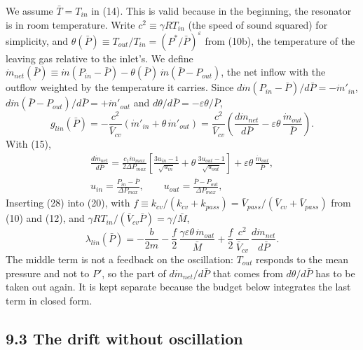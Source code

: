 \documentclass[11pt]{article}
\begin{document}
We assume $\bar T = T_{in}$ in (14). This is valid because in the beginning, the resonator is in room temperature. Write $c^2 \equiv \gamma RT_{in}$ (the speed of sound squared) for simplicity, and $\theta(\bar P) \equiv T_{out}/T_{in} = (P^*/\bar P)^{\varepsilon}$ from (10b), the temperature of the leaving gas relative to the inlet's. We define $\dot m_{net}(\bar P) \equiv \dot m(P_{in} - \bar P) - \theta(\bar P)\,\dot m(\bar P - P_{out})$, the net inflow with the outflow weighted by the temperature it carries. Since $d\dot m(P_{in} - \bar P)/d\bar P = -\dot m'_{in}$, $d\dot m(\bar P - P_{out})/d\bar P = +\dot m'_{out}$ and $d\theta/d\bar P = -\varepsilon\theta/\bar P$,
\begin{equation}
g_{lin}(\bar P) = -\frac{c^2}{\bar V_{cv}}\left(\dot m'_{in} + \theta\,\dot m'_{out}\right) = \frac{c^2}{\bar V_{cv}}\left(\frac{d\dot m_{net}}{d\bar P} - \varepsilon\theta\,\frac{\dot m_{out}}{\bar P}\right) . \tag{28}
\end{equation}
With (15),
\begin{equation}
\begin{gathered}
\frac{d\dot m_{net}}{d\bar P} = \frac{c_1\dot m_{max}}{2\Delta P_{max}}\left[\frac{3u_{in}-1}{\sqrt{u_{in}}} + \theta\,\frac{3u_{out}-1}{\sqrt{u_{out}}}\right] + \varepsilon\theta\,\frac{\dot m_{out}}{\bar P}, \\
u_{in} = \frac{P_{in} - \bar P}{\Delta P_{max}}, \qquad u_{out} = \frac{\bar P - P_{out}}{\Delta P_{max}},
\end{gathered} \tag{29}
\end{equation}
Inserting (28) into (20), with $f \equiv k_{cv}/(k_{cv} + k_{pass}) = \bar V_{pass}/(\bar V_{cv} + \bar V_{pass})$ from (10) and (12), and $\gamma RT_{in}/(\bar V_{cv}\bar P) = \gamma/\bar M$,
\begin{equation}
\lambda_{lin}(\bar P) = -\frac{b}{2m} - \frac{f}{2}\,\frac{\gamma\varepsilon\theta\,\dot m_{out}}{\bar M} + \frac{f}{2}\,\frac{c^2}{\bar V_{cv}}\,\frac{d\dot m_{net}}{d\bar P} . \tag{30}
\end{equation}
The middle term is not a feedback on the oscillation: $T_{out}$ responds to the mean pressure and not to $P'$, so the part of $d\dot m_{net}/d\bar P$ that comes from $d\theta/d\bar P$ has to be taken out again. It is kept separate because the budget below integrates the last term in closed form.

\subsection*{9.3 The drift without oscillation}
\end{document}
